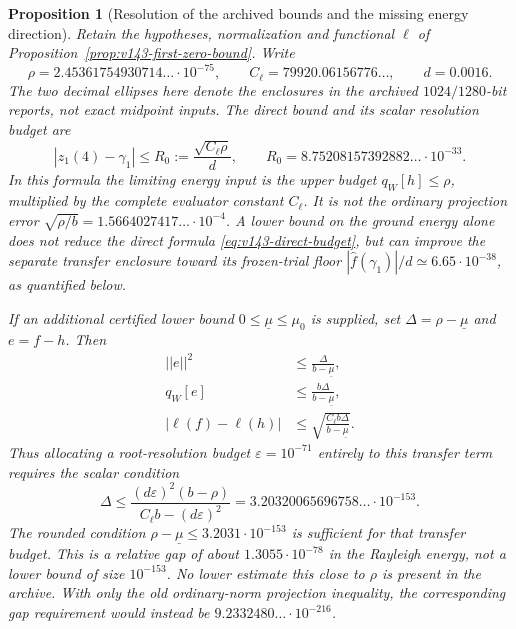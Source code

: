 \documentclass[11pt]{article}
\def\norm#1{||#1||}%
\newtheorem{proposition}[theorem]{Proposition}
\theoremstyle{remark}
\newcommand{\norm}[1]{\left\lVert #1\right\rVert}
\begin{document}
\begin{proposition}[Resolution of the archived bounds and the missing energy direction]
\label{prop:v143-resolution}
Retain the hypotheses, normalization and functional $\ell$ of
Proposition~\ref{prop:v143-first-zero-bound}. Write
\[
 \rho=2.45361754930714\ldots\cdot10^{-75},\qquad
 C_\ell=79920.06156776\ldots,\qquad d=0.0016.
\]
The two decimal ellipses here denote the enclosures in the archived
$1024/1280$-bit reports, not exact midpoint inputs.
The direct bound and its scalar resolution budget are
\begin{equation}\label{eq:v143-direct-budget}
 |z_1(4)-\gamma_1|\le R_0:=\frac{\sqrt{C_\ell\rho}}d,
 \qquad R_0=8.75208157392882\ldots\cdot10^{-33}.
\end{equation}
In this formula the limiting energy input is the \emph{upper} budget
$q_W[h]\le\rho$, multiplied by the complete evaluator constant
$C_\ell$. It is not the ordinary projection error
$\sqrt{\rho/b}=1.5664027417\ldots\cdot10^{-4}$.
A lower bound on the ground energy alone does not reduce the direct
formula \eqref{eq:v143-direct-budget}, but can improve the separate
transfer enclosure toward its frozen-trial floor
$|\widehat f(\gamma_1)|/d\simeq6.65\cdot10^{-38}$, as quantified below.

If an additional certified lower bound $0\le\underline\mu\le\mu_0$
is supplied, set $\Delta=\rho-\underline\mu$ and $e=f-h$. Then
\begin{align}
 \norm e^2&\le\frac{\Delta}{b-\underline\mu},\label{eq:v143-lower-norm}\\
 q_W[e]&\le\frac{b\Delta}{b-\underline\mu},\label{eq:v143-lower-energy}\\
 |\ell(f)-\ell(h)|&\le
 \sqrt{\frac{C_\ell b\Delta}{b-\underline\mu}}.
 \label{eq:v143-lower-transfer}
\end{align}
Thus allocating a root-resolution budget $\varepsilon=10^{-71}$
entirely to this transfer term requires the scalar condition
\begin{equation}\label{eq:v143-required-lower}
 \Delta\le
 \frac{(d\varepsilon)^2(b-\rho)}{C_\ell b-(d\varepsilon)^2}
 =3.20320065696758\ldots\cdot10^{-153}.
\end{equation}
The rounded condition $\rho-\underline\mu\le3.2031\cdot10^{-153}$
is sufficient for that transfer budget. This is a relative gap of
about $1.3055\cdot10^{-78}$ in the Rayleigh energy, not a lower
bound of size $10^{-153}$. No lower estimate this close to $\rho$
is present in the archive. With only the old ordinary-norm projection
inequality, the corresponding gap requirement would instead be
$9.2332480\ldots\cdot10^{-216}$.


\end{proposition}
\end{document}
